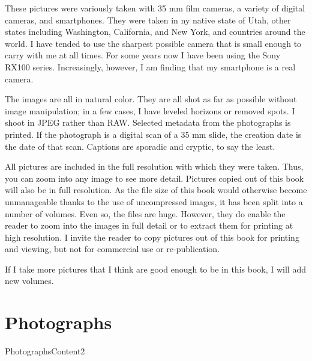 \documentclass[10pt,letter,oneside]{scrbook}
\begin{document}
	These pictures were variously taken with 35 mm film cameras, a variety of digital cameras, and smartphones. They were taken in ny native state of Utah, other states including Washington, California, and New York, and countries around the world. I have tended to use the sharpest possible camera that is small enough to carry with me at all times. For some years now I have been using the Sony RX100 series. Increasingly, however, I am finding that my smartphone is a real camera.
	
	The images are all in natural color. They are all shot as far as possible without image manipulation; in a few cases, I have leveled horizons or removed spots. I shoot in JPEG rather than RAW. Selected metadata from the photographs is printed. If the photograph is a digital scan of a 35 mm slide, the creation date is the date of that scan. Captions are sporadic and cryptic, to say the least.
	
	All pictures are included in the full resolution with which they were taken. Thus, you can zoom into any image to see more detail. Pictures copied out of this book will also be in full resolution. As the file size of this book would otherwise become unmanageable thanks to the use of uncompressed images, it has been split into a number of volumes. Even so, the files are huge. However, they do enable the reader to zoom into the images in full detail or to extract them for printing at high resolution. I invite the reader to copy pictures out of this book for printing and viewing, but not for commercial use or re-publication. 
	
	If I take more pictures that I think are good enough to be in this book, I will add new volumes.
	
	\chapter{Photographs}
	
	 {PhotographsContent2}
	
\end{document}
